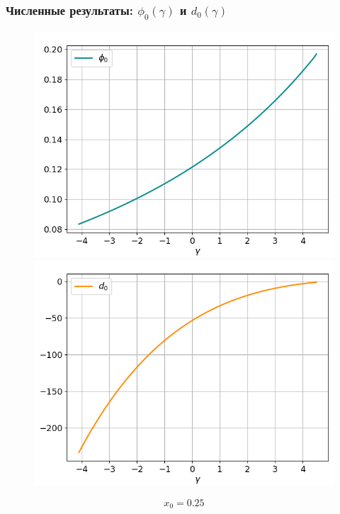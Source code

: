 \documentclass[fullscreen=true, unicode, bookmarks=false]{beamer}
\begin{document}
\begin{frame}
\frametitle{ Численные результаты: $ \phi_0(\gamma) $ и $ d_0(\gamma) $ }

\begin{figure} 
\includegraphics[scale=0.37]{oscillating_phi0_14.png}  
\hfill
\includegraphics[scale=0.37]{oscillating_d0_14.png}  
\end{figure}

$$ x_0 = 0.25 $$

\end{frame}
\end{document}
